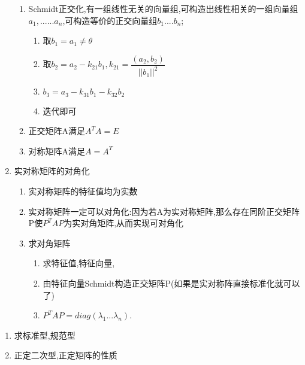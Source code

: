 \documentclass[11pt, a4paper, UTF8]{ctexart}
\begin{document}
\begin{solution}
\begin{enumerate}
\begin{enumerate}
  \item Schmidt正交化,有一组线性无关的向量组,可构造出线性相关的一组向量组$a_1,......a_n$,可构造等价的正交向量组$b_1....b_n$;
  \begin{enumerate}
    \item 取$b_1=a_1\neq \theta$ 
    \item 取$b_2=a_2-k_{21}b_1,k_{21}=\dfrac{(a_2,b_2)}{||b_1||^2}$
    \item $b_3=a_3-k_{31}b_1-k_{32}b_2$
    \item 迭代即可
  \end{enumerate}
  \item 正交矩阵A满足$A^{T}A=E$
  \item 对称矩阵A满足$A=A^{T}$
\end{enumerate}
\item 实对称矩阵的对角化
\begin{enumerate}
  \item 实对称矩阵的特征值均为实数
  \item 实对称矩阵一定可以对角化:因为若A为实对称矩阵,那么存在同阶正交矩阵P使$P^{T}AP$为实对角矩阵,从而实现可对角化
  \item 求对角矩阵
  \begin{enumerate}
    \item 求特征值,特征向量,
    \item 由特征向量Schmidt构造正交矩阵P(如果是实对称阵直接标准化就可以了)
    \item $P^{T}AP=diag(\lambda _1...\lambda _n)$.
  \end{enumerate}
\end{enumerate}
\end{enumerate}
\end{solution}
\begin{problem}[实二次型]
  \begin{enumerate}
  \item 求标准型,规范型
  \item 正定二次型,正定矩阵的性质
  \end{enumerate}
\end{problem}
\end{document}
